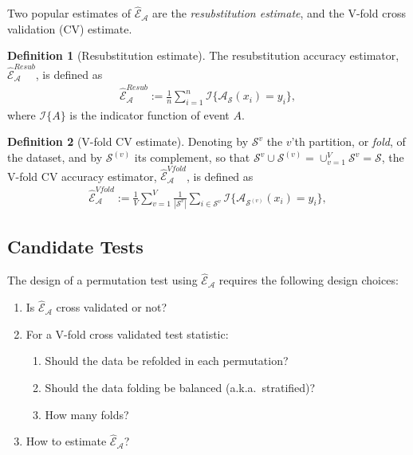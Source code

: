 \documentclass[12pt,a4paper]{article}
\theoremstyle{definition}
\newtheorem{definition}{Definition}
\newcommand{\set}[1]{\{ #1 \}} %
\newcommand{\indicator}[1]{\mathcal{I}{\set{#1}}} %
\newcommand{\features}{x} %
\newcommand{\outcomes}{y} %
\newcommand{\accEstim}{\hat{\mathcal{E}}}
\newcommand{\hypFun}[2]{\algo_{#1}(#2)} %
\newcommand{\algo}{\mathcal{A}}
\newcommand{\data}{\mathcal{S}}
\newcommand{\union}{\cup}
\begin{document}
Two popular estimates of $\accEstim_{\algo}$ are the \emph{resubstitution estimate}, and the V-fold cross validation (CV) estimate.
\begin{definition}[Resubstitution estimate]
\label{def:resubstitution}
The resubstitution accuracy estimator, $\accEstim_{\algo}^{Resub}$,  is defined as
\begin{align}
	\accEstim_{\algo}^{Resub} := \frac 1n \sum_{i=1}^{n} \indicator{\hypFun{\data}{\features_i}=\outcomes_i}, 
\end{align}
where $\indicator{A}$ is the indicator function of event $A$. 
\end{definition}


\begin{definition}[V-fold CV estimate]
\label{def:v-fold}
Denoting by $\data^{v}$ the $v$'th partition, or \emph{fold}, of the dataset, and by $\data^{(v)}$ its complement, so that $\data^{v} \union \data^{(v)}=\union_{v=1}^V \data^{v}=\data$, the V-fold CV accuracy estimator, $\accEstim_{\algo}^{Vfold}$, is defined as 	
\begin{align}
	\accEstim_{\algo}^{Vfold} := 
	\frac 1V \sum_{v=1}^{V} \frac{1}{|\data^v|} \sum_{i \in \data^{v}} \indicator{\hypFun{\data^{(v)}}{\features_i}=\outcomes_i}, 
\end{align}
\end{definition}




\subsection{Candidate Tests}
\label{sec:considerations}

The design of a permutation test using $\accEstim_{\algo}$ requires the following design choices: 
\begin{enumerate}
\item Is $\accEstim_{\algo}$ cross validated or not?
\item For a V-fold cross validated test statistic:
\begin{enumerate}
\item Should the data be refolded in each permutation? 
\item Should the data folding be balanced (a.k.a.\ stratified)?
\item How many folds? 
\end{enumerate}
\item How to estimate $\accEstim_{\algo}$?
\end{enumerate}
\end{document}
